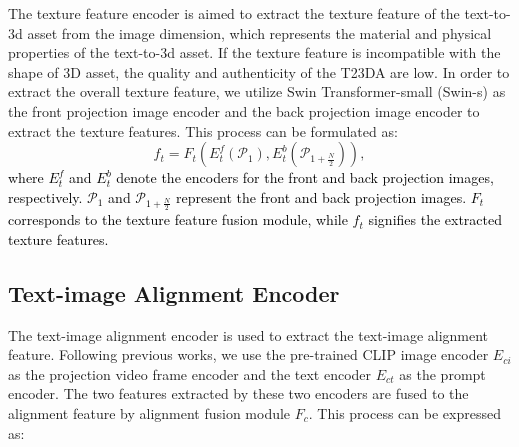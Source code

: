The texture feature encoder is aimed to extract the texture feature of the text-to-3d asset from the image dimension, which represents the material and physical properties of the text-to-3d asset. If the texture feature is incompatible with the shape of 3D asset, the quality and authenticity of the T23DA are low. In order to extract the overall texture feature, we utilize Swin Transformer-small (Swin-s)\cite{liu2021swin} as the front projection image encoder and the back projection image encoder to extract the texture features. This process can be formulated as:
\begin{equation}
     f_{t}  = F_{t}( E_{t}^{f}(\mathcal{P}_{1}) , E_{t}^{b}(\mathcal{P}_{1+\frac{N}{2}}) ),
\end{equation}
\textcolor{black}{where $E_{t}^{f}$ and $E_{t}^{b}$ denote the encoders for the front and back projection images, respectively. $\mathcal{P}_{1}$ and $\mathcal{P}_{1+\frac{N}{2}}$ represent the front and back projection images. $F_{t}$ corresponds to the texture feature fusion module, while $f_{t}$ signifies the extracted texture features.}
\vspace{-15pt}
\subsection{Text-image Alignment Encoder}
The text-image alignment encoder is used to extract the text-image alignment feature. Following previous works, we use the pre-trained CLIP \cite{radford2021learning} image encoder $E_{ci}$ as the projection video frame encoder and the text encoder $E_{ct}$ as the prompt encoder. The two features extracted by these two encoders are fused to the alignment feature by alignment fusion module $F_{c}$. This process can be expressed as:

